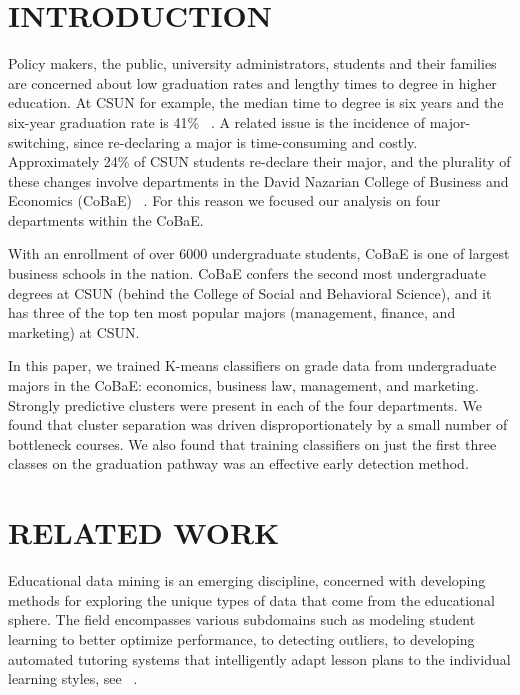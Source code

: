 \documentclass{sigchi}
\begin{document}



\section{INTRODUCTION}

Policy makers, the public, university administrators, students and their families are concerned about low graduation rates and lengthy times to degree in higher education. At CSUN for example, the median time to degree is six years and the six-year graduation rate is 41\% ~\cite{csun1}. A related issue is the incidence of major-switching, since re-declaring a major is time-consuming and costly. Approximately 24\% of CSUN students re-declare their major, and the plurality of these changes involve departments in the David Nazarian College of Business and Economics (CoBaE) ~\cite{csun2}. For this reason we focused our analysis on four departments within the CoBaE.

With an enrollment of over 6000 undergraduate students, CoBaE is one of largest business schools in the nation. CoBaE confers the second most undergraduate degrees at CSUN (behind the College of Social and Behavioral Science), and it has three of the top ten most popular majors (management, finance, and marketing) at CSUN. 

In this paper, we trained K-means classifiers on grade data from undergraduate majors in the CoBaE: economics, business law, management, and marketing. Strongly predictive clusters were present in each of the four departments. We found that cluster separation was driven disproportionately by a small number of bottleneck courses. We also found that training classifiers on just the first three classes on the graduation pathway was an effective early detection method. 

\section{RELATED WORK}

Educational data mining is an emerging discipline, concerned with developing methods for exploring the unique types of data that come from the educational sphere. The field encompasses various subdomains such as modeling student learning to better optimize performance, to detecting outliers, to developing automated tutoring systems that intelligently adapt lesson plans to the individual learning styles, see ~\cite{romero2010educational}. 
\end{document}
